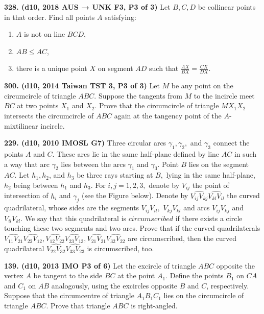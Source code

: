 \documentclass{article}
\begin{document}
\textbf{328. (\color{red}d10\color{black}, 2018 AUS → UNK F3, P3 of 3)} Let $B, C, D$ be collinear points in that order. Find all points $A$ satisfying:
\renewcommand{\labelenumi}{\theenumi}
\renewcommand{\theenumi}{\roman{enumi})}
\begin{enumerate}
    \item $A$ is not on line $BCD$,
    \item $AB \leq AC$,
    \item there is a unique point $X$ on segment $AD$ such that $\frac{AX}{BX} = \frac{CX}{DX}.$
\end{enumerate}

\textbf{300. (\color{red}d10\color{black}, 2014 Taiwan TST 3, P3 of 3)} Let $M$ be any point on the circumcircle of triangle $ABC$. Suppose the tangents from $M$ to the incircle meet $BC$ at two points $X_1$ and $X_2$.  Prove that the circumcircle of triangle $MX_1X_2$ intersects the circumcircle of $ABC$ again at the tangency point of the $A$-mixtilinear incircle.

\textbf{229. (\color{red}d10\color{black}, 2010 IMOSL G7)} Three circular arcs $\gamma_1, \gamma_2,$ and $\gamma_3$ connect the points $A$ and $C.$ These arcs lie in the same half-plane defined by line $AC$ in such a way that arc $\gamma_2$ lies between the arcs $\gamma_1$ and $\gamma_3.$ Point $B$ lies on the segment $AC.$ Let $h_1, h_2$, and $h_3$ be three rays starting at $B,$ lying in the same half-plane, $h_2$ being between $h_1$ and $h_3.$ For $i, j = 1, 2, 3,$ denote by $V_{ij}$ the point of intersection of $h_i$ and $\gamma_j$ (see the Figure below). Denote by $\widehat{V_{ij}V_{kj}}\widehat{V_{kl}V_{il}}$ the curved quadrilateral, whose sides are the segments $V_{ij}V_{il},$ $V_{kj}V_{kl}$ and arcs $V_{ij}V_{kj}$ and $V_{il}V_{kl}.$ We say that this quadrilateral is $circumscribed$ if there exists a circle touching these two segments and two arcs. Prove that if the curved quadrilaterals $\widehat{V_{11}V_{21}}\widehat{V_{22}V_{12}}, \widehat{V_{12}V_{22}}\widehat{V_{23}V_{13}},\widehat{V_{21}V_{31}}\widehat{V_{32}V_{22}}$ are circumscribed, then the curved quadrilateral $\widehat{V_{22}V_{32}}\widehat{V_{33}V_{23}}$ is circumscribed, too.

\textbf{139. (\color{red}d10\color{black}, 2013 IMO P3 of 6)} Let the excircle of triangle $ABC$ opposite the vertex $A$ be tangent to the side $BC$ at the point $A_1$. Define the points $B_1$ on $CA$ and $C_1$ on $AB$ analogously, using the excircles opposite $B$ and $C$, respectively. Suppose that the circumcentre of triangle $A_1B_1C_1$ lies on the circumcircle of triangle $ABC$. Prove that triangle $ABC$ is right-angled.
\end{document}
